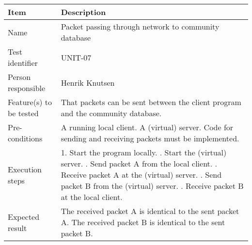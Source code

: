 \documentclass[12pt, fullpage, oneside]{report}
\begin{document}
		\begin{center}
			\begin{tabular}{ |  p{3.5cm} | p{10cm} | }
				\hline
				Item & Description \\ [5pt] \hline \hline
				Name & Packet passing through network to community database \\  [5pt] \hline
				Test identifier & UNIT-07 \\  [5pt] \hline
				Person responsible & Henrik Knutsen \\  [5pt] \hline
				Feature(s) to be tested & That packets can be sent between the client program and the community database.  \\  [5pt] \hline
				Pre-conditions & A running local client. A (virtual) server. Code for sending and receiving packets must be implemented. \\  [5pt] \hline
				Execution steps & 1. Start the program locally. \newline 2. Start the (virtual) server. \newline 3. Send packet A from the local client. \newline 4. Receive packet A at the (virtual) server. \newline 5. Send packet B from the (virtual) server.
					\newline 6. Receive packet B at the local client. \\  [5pt] \hline
				Expected result & The received packet A is identical to the sent packet A. The received packet B is identical to the sent packet B. \\  [5pt] \hline
			\end{tabular}
		\end{center}
\end{document}
